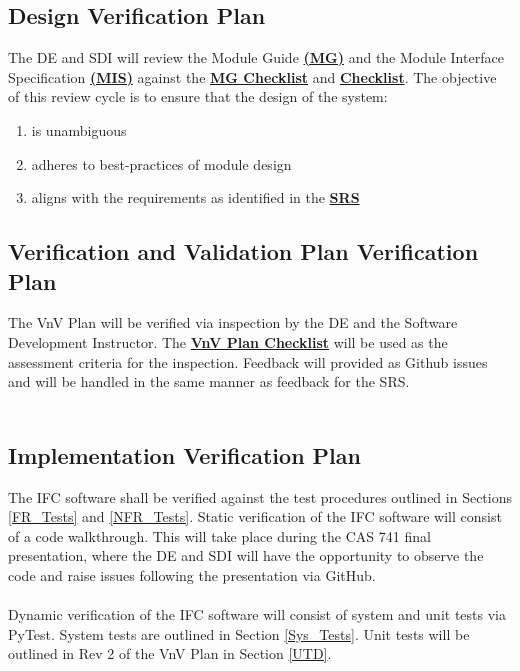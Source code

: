 \documentclass[12pt, titlepage]{article}
\begin{document}
\subsection{Design Verification Plan}
The DE and SDI will review the Module Guide 
\textbf{\href{https://github.com/KiranSingh15/CAS-741-Image-Correspondences/blob/main/docs/Design/SoftArchitecture/MG.pdf}
{(MG)}} and the Module Interface Specification 
\textbf{\href{https://github.com/KiranSingh15/CAS-741-Image-Correspondences/blob/main/docs/Design/SoftDetailedDes/MIS.pdf}
{(MIS)}} against the 
\textbf{\href{https://github.com/KiranSingh15/CAS-741-Image-Correspondences/blob/main/docs/Checklists/MG-Checklist.pdf}
{MG Checklist}} and
\textbf{\href{https://github.com/KiranSingh15/CAS-741-Image-Correspondences/blob/main/docs/Checklists/MIS-Checklist.pdf}
{ Checklist}}. The objective of this review cycle is to ensure that the design of the system:
\begin{enumerate}
\item is unambiguous
\item adheres to best-practices of module design
\item aligns with the requirements as identified in the 
\textbf{\href{https://github.com/KiranSingh15/CAS-741-Image-Correspondences/blob/main/docs/SRS/SRS.pdf}
{SRS}}
\end{enumerate}


\subsection{Verification and Validation Plan Verification Plan}
The VnV Plan will be verified via inspection by the DE and the 
Software Development Instructor. The 
\textbf{\href{https://github.com/KiranSingh15/CAS-741-Image-Correspondences/blob/main/docs/Checklists/VnV-Checklist.pdf}
{VnV Plan Checklist}} 
will be used as the assessment criteria for the inspection. 
Feedback will provided as Github issues and will be handled in the same manner as feedback 
for the SRS.\\ \\


\subsection{Implementation Verification Plan}
The IFC software shall be verified against the test procedures outlined in Sections \ref{FR_Tests} and 
\ref{NFR_Tests}. Static verification of the IFC software will consist of a code walkthrough. This will take 
place during the CAS 741 final presentation, where the DE and SDI will have the opportunity to observe 
the code and raise issues following the presentation via GitHub. \\ \\
Dynamic verification of the IFC software will consist of system and unit tests via PyTest. System tests 
are outlined in Section \ref{Sys_Tests}. Unit tests will be outlined in Rev 2 of the VnV Plan in 
Section \ref{UTD}.
\end{document}
